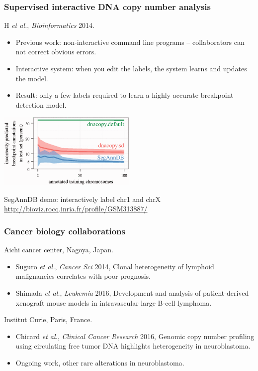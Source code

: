 \documentclass{beamer}
\begin{document}
\begin{frame}
  \frametitle{Supervised interactive DNA copy number analysis}
  H {\it et al.}, {\it Bioinformatics} 2014.

  \begin{itemize}
  \item Previous work: non-interactive command line programs
    -- collaborators can not correct obvious
    errors.
  \item Interactive system: when you edit the labels, the system
    learns and updates the model.
  \item Result: only a few labels required to learn a highly accurate
    breakpoint detection model.
  \end{itemize}

\includegraphics[width=0.5\textwidth]{SegAnnDB-test-error-decreases}

SegAnnDB demo: interactively label chr1 and chrX
  \url{http://bioviz.rocq.inria.fr/profile/GSM313887/}
\end{frame}

\begin{frame}
  \frametitle{Cancer biology collaborations}
  Aichi cancer center, Nagoya, Japan.
  \begin{itemize}
  \item Suguro {\it et al.}, {\it Cancer Sci} 2014, Clonal
    heterogeneity of lymphoid malignancies correlates with poor
    prognosis.
  \item Shimada {\it et al.}, {\it Leukemia} 2016, Development and
    analysis of patient-derived xenograft mouse models in
    intravascular large B-cell lymphoma.
  \end{itemize}
  Institut Curie, Paris, France.
  \begin{itemize}
  \item Chicard {\it et al.}, {\it Clinical Cancer Research} 2016,
    Genomic copy number profiling using circulating free tumor DNA
    highlights heterogeneity in neuroblastoma.
  \item Ongoing work, other rare alterations in neuroblastoma.
  \end{itemize}
\end{frame}
\end{document}
